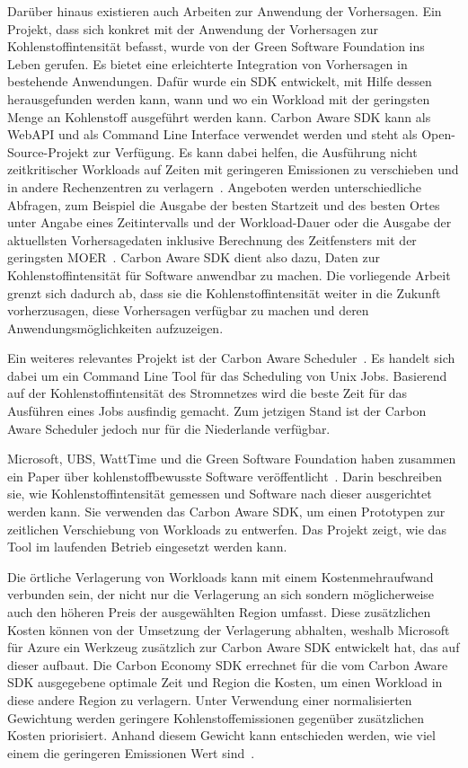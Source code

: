 Darüber hinaus existieren auch Arbeiten zur Anwendung der Vorhersagen.
Ein Projekt, dass sich konkret mit der Anwendung der Vorhersagen zur Kohlenstoffintensität befasst, wurde von der Green Software Foundation ins Leben gerufen.
Es bietet eine erleichterte Integration von Vorhersagen in bestehende Anwendungen.
Dafür wurde ein \ac{SDK} entwickelt, mit Hilfe dessen herausgefunden werden kann, wann und wo ein Workload mit der geringsten Menge an Kohlenstoff ausgeführt werden kann.
Carbon Aware \ac{SDK} kann als Web\ac{API} und als Command Line Interface verwendet werden und steht als Open-Source-Projekt zur Verfügung.
Es kann dabei helfen, die Ausführung nicht zeitkritischer Workloads auf Zeiten mit geringeren Emissionen zu verschieben und in andere Rechenzentren zu verlagern~\cite{GreenSoftwareFoundation.20231212T09:58:27.000Z}.
Angeboten werden unterschiedliche Abfragen, zum Beispiel die Ausgabe der besten Startzeit und des besten Ortes unter Angabe eines Zeitintervalls und der Workload-Dauer oder die Ausgabe der aktuellsten Vorhersagedaten inklusive Berechnung des Zeitfensters mit der geringsten \ac{MOER}~\cite{GreenSoftwareFoundation.20240316T16:54:58.000Z}.
Carbon Aware \ac{SDK} dient also dazu, Daten zur Kohlenstoffintensität für Software anwendbar zu machen.
Die vorliegende Arbeit grenzt sich dadurch ab, dass sie die Kohlenstoffintensität weiter in die Zukunft vorherzusagen, diese Vorhersagen verfügbar zu machen und deren Anwendungsmöglichkeiten aufzuzeigen.

Ein weiteres relevantes Projekt ist der Carbon Aware Scheduler~\cite{Siemers.20240319T14:09:25.000Z}.
Es handelt sich dabei um ein Command Line Tool für das Scheduling von Unix Jobs.
Basierend auf der Kohlenstoffintensität des Stromnetzes wird die beste Zeit für das Ausführen eines Jobs ausfindig gemacht.
Zum jetzigen Stand ist der Carbon Aware Scheduler jedoch nur für die Niederlande verfügbar.

Microsoft, UBS, WattTime und die Green Software Foundation haben zusammen ein Paper über kohlenstoffbewusste Software veröffentlicht~\cite{Buchanan.2023}.
Darin beschreiben sie, wie Kohlenstoffintensität gemessen und Software nach dieser ausgerichtet werden kann.
Sie verwenden das Carbon Aware \ac{SDK}, um einen Prototypen zur zeitlichen Verschiebung von Workloads zu entwerfen.
Das Projekt zeigt, wie das Tool im laufenden Betrieb eingesetzt werden kann.

Die örtliche Verlagerung von Workloads kann mit einem Kostenmehraufwand verbunden sein, der nicht nur die Verlagerung an sich sondern möglicherweise auch den höheren Preis der ausgewählten Region umfasst.
Diese zusätzlichen Kosten können von der Umsetzung der Verlagerung abhalten, weshalb Microsoft für Azure ein Werkzeug zusätzlich zur Carbon Aware \ac{SDK} entwickelt hat, das auf dieser aufbaut.
Die Carbon Economy \ac{SDK} errechnet für die vom Carbon Aware \ac{SDK} ausgegebene optimale Zeit und Region die Kosten, um einen Workload in diese andere Region zu verlagern.
Unter Verwendung einer normalisierten Gewichtung werden geringere Kohlenstoffemissionen gegenüber zusätzlichen Kosten priorisiert.
Anhand diesem Gewicht kann entschieden werden, wie viel einem die geringeren Emissionen Wert sind~\cite{Norlander.2023}.

